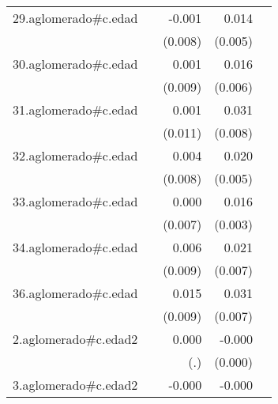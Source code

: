 {\begin{longtable}{l*{4}{D{.}{.}{-1}}}
\addlinespace
29.aglomerado#c.edad&                     &      -0.001         &       0.014\sym{**} &                     \\
            &                     &     (0.008)         &     (0.005)         &                     \\
\addlinespace
30.aglomerado#c.edad&                     &       0.001         &       0.016\sym{**} &                     \\
            &                     &     (0.009)         &     (0.006)         &                     \\
\addlinespace
31.aglomerado#c.edad&                     &       0.001         &       0.031\sym{***}&                     \\
            &                     &     (0.011)         &     (0.008)         &                     \\
\addlinespace
32.aglomerado#c.edad&                     &       0.004         &       0.020\sym{***}&                     \\
            &                     &     (0.008)         &     (0.005)         &                     \\
\addlinespace
33.aglomerado#c.edad&                     &       0.000         &       0.016\sym{***}&                     \\
            &                     &     (0.007)         &     (0.003)         &                     \\
\addlinespace
34.aglomerado#c.edad&                     &       0.006         &       0.021\sym{**} &                     \\
            &                     &     (0.009)         &     (0.007)         &                     \\
\addlinespace
36.aglomerado#c.edad&                     &       0.015         &       0.031\sym{***}&                     \\
            &                     &     (0.009)         &     (0.007)         &                     \\
\addlinespace
2.aglomerado#c.edad2&                     &       0.000         &      -0.000         &                     \\
            &                     &         (.)         &     (0.000)         &                     \\
\addlinespace
3.aglomerado#c.edad2&                     &      -0.000         &      -0.000\sym{**} &                     \\

\end{longtable}}
